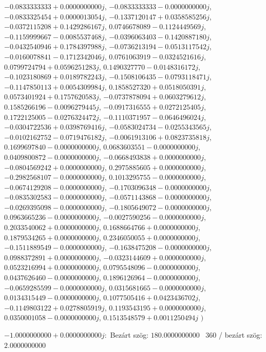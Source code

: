 \documentclass[14pt,a4paper]{article}
\begin{document}
\begin{itemize}
$-0.0833333333+0.0000000000j$, $-0.0833333333-0.0000000000j$, $-0.0833325454+0.0000013054j$, $-0.1337120147+0.0358585256j$, $-0.0372115208+0.1429286167j$, $0.0746678089-0.1124449569j$, $-0.1159999667-0.0085537468j$, $-0.0396063403-0.1420887180j$, $-0.0432540946+0.1784397988j$, $-0.0736213194-0.0513117542j$, $-0.0160078841-0.1712342046j$, $0.0761063919-0.0324521616j$, $0.0799724794+0.0596251283j$, $0.1490327770-0.0148316172j$, $-0.1023180869+0.0189782243j$, $-0.1508106435-0.0793118471j$, $-0.1147850113+0.0054309984j$, $0.1858527320+0.0518050391j$, $0.0573401924+0.1757620583j$, $-0.0737878094+0.0603279612j$, $0.1585266196-0.0096279445j$, $-0.0917316555+0.0272125405j$, $0.1722125005-0.0276324472j$, $-0.1110371957-0.0646496024j$, $-0.0304722536+0.0398769416j$, $-0.0583024734-0.0255343565j$, $-0.0102162752-0.0719476182j$, $-0.0061913106+0.0823735818j$, $0.1699697840-0.0000000000j$, $0.0683603551-0.0000000000j$, $0.0409800872-0.0000000000j$, $-0.0668493838+0.0000000000j$, $-0.0804569242+0.0000000000j$, $0.2975885605+0.0000000000j$, $-0.2982568107-0.0000000000j$, $0.1013295755-0.0000000000j$, $-0.0674129208-0.0000000000j$, $-0.1703096348-0.0000000000j$, $-0.0835302583-0.0000000000j$, $-0.0571143868-0.0000000000j$, $-0.0269395098-0.0000000000j$, $-0.1805649072-0.0000000000j$, $0.0963665236-0.0000000000j$, $-0.0027590256-0.0000000000j$, $0.2033540062+0.0000000000j$, $0.1688664766+0.0000000000j$, $0.1879534265+0.0000000000j$, $0.2346050055+0.0000000000j$, $-0.1511889549-0.0000000000j$, $-0.1638475208-0.0000000000j$, $0.0988372891+0.0000000000j$, $-0.0323144609+0.0000000000j$, $0.0523216994+0.0000000000j$, $0.0795548096-0.0000000000j$, $0.0437626460-0.0000000000j$, $0.1896126964-0.0000000000j$, $-0.0659285599-0.0000000000j$, $0.0315681665-0.0000000000j$, $0.0134315449-0.0000000000j$, $0.1077505416+0.0423436702j$, $-0.1149803122+0.0278805919j$, $0.1193543195+0.0000000000j$, $0.0350001058-0.0000000000j$, $0.1513548579+0.0011250494j$
$\big)$
\end{itemize}
$-1.0000000000+0.0000000000j$:\
Bezárt szög: $180.0000000000$ \
360 / bezárt szög: $2.0000000000$\
\end{document}
